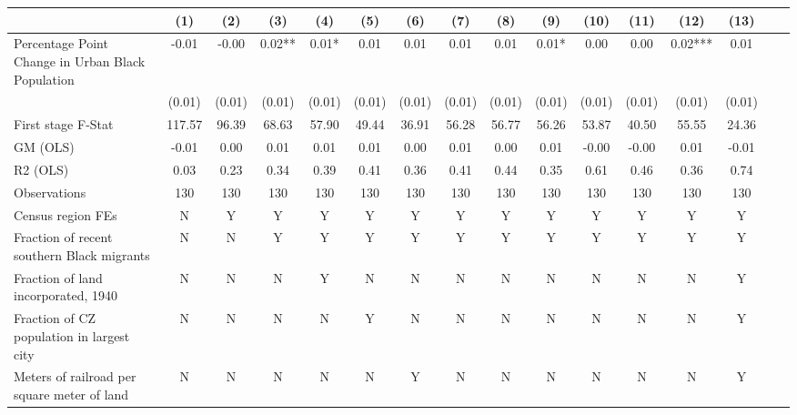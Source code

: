  \begin{tabular}{l*{15}{c}} \toprule
                    &\multicolumn{1}{c}{(1)}   &\multicolumn{1}{c}{(2)}   &\multicolumn{1}{c}{(3)}   &\multicolumn{1}{c}{(4)}   &\multicolumn{1}{c}{(5)}   &\multicolumn{1}{c}{(6)}   &\multicolumn{1}{c}{(7)}   &\multicolumn{1}{c}{(8)}   &\multicolumn{1}{c}{(9)}   &\multicolumn{1}{c}{(10)}   &\multicolumn{1}{c}{(11)}   &\multicolumn{1}{c}{(12)}   &\multicolumn{1}{c}{(13)}   \\
\midrule
Percentage Point Change in Urban Black Population& -0.01   & -0.00   &  0.02** &  0.01*  &  0.01   &  0.01   &  0.01   &  0.01   &  0.01*  &  0.00   &  0.00   &  0.02***&  0.01   \\
                    &(0.01)   &(0.01)   &(0.01)   &(0.01)   &(0.01)   &(0.01)   &(0.01)   &(0.01)   &(0.01)   &(0.01)   &(0.01)   &(0.01)   &(0.01)   \\
\midrule
First stage F-Stat  &117.57   & 96.39   & 68.63   & 57.90   & 49.44   & 36.91   & 56.28   & 56.77   & 56.26   & 53.87   & 40.50   & 55.55   & 24.36   \\
GM (OLS)            & -0.01   &  0.00   &  0.01   &  0.01   &  0.01   &  0.00   &  0.01   &  0.00   &  0.01   & -0.00   & -0.00   &  0.01   & -0.01   \\
R2 (OLS)            &  0.03   &  0.23   &  0.34   &  0.39   &  0.41   &  0.36   &  0.41   &  0.44   &  0.35   &  0.61   &  0.46   &  0.36   &  0.74   \\
Observations        &   130   &   130   &   130   &   130   &   130   &   130   &   130   &   130   &   130   &   130   &   130   &   130   &   130   \\
Census region FEs   &     N   &     Y   &     Y   &     Y   &     Y   &     Y   &     Y   &     Y   &     Y   &     Y   &     Y   &     Y   &     Y   \\
Fraction of recent southern Black migrants&     N   &     N   &     Y   &     Y   &     Y   &     Y   &     Y   &     Y   &     Y   &     Y   &     Y   &     Y   &     Y   \\
Fraction of land incorporated, 1940&     N   &     N   &     N   &     Y   &     N   &     N   &     N   &     N   &     N   &     N   &     N   &     N   &     Y   \\
Fraction of CZ population in largest city&     N   &     N   &     N   &     N   &     Y   &     N   &     N   &     N   &     N   &     N   &     N   &     N   &     Y   \\
Meters of railroad per square meter of land&     N   &     N   &     N   &     N   &     N   &     Y   &     N   &     N   &     N   &     N   &     N   &     N   &     Y   \\

\end{tabular}
